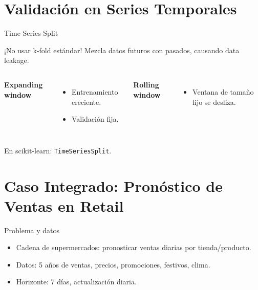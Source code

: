 \documentclass[aspectratio=169, 10pt, xcolor=table]{beamer}
\begin{document}
\section{Validación en Series Temporales}

\begin{frame}{Time Series Split}
    \begin{alertblock}{¡No usar k-fold estándar!}
        Mezcla datos futuros con pasados, causando data leakage.
    \end{alertblock}
    \begin{columns}[t]
        \textbf{Expanding window}
        \begin{itemize}
            \item Entrenamiento creciente.
            \item Validación fija.
        \end{itemize}
        \textbf{Rolling window}
        \begin{itemize}
            \item Ventana de tamaño fijo se desliza.
        \end{itemize}
    \end{columns}
    \vspace{0.3cm}
    En scikit-learn: \texttt{TimeSeriesSplit}.
\end{frame}

\section{Caso Integrado: Pronóstico de Ventas en Retail}

\begin{frame}{Problema y datos}
    \begin{itemize}
        \item Cadena de supermercados: pronosticar ventas diarias por tienda/producto.
        \item Datos: 5 años de ventas, precios, promociones, festivos, clima.
        \item Horizonte: 7 días, actualización diaria.
    \end{itemize}
\end{frame}
\end{document}
